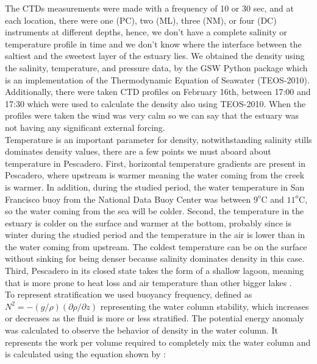 \documentclass[tesis.tex]{subfiles}
\begin{document}
The CTDs measurements were made with a frequency of 10 or 30 sec, and at each location, there were one (PC), two (ML), three (NM), or four (DC) instruments at different depths, hence, we don't have a complete salinity or temperature profile in time and we don't know where the interface between the saltiest and the sweetest layer of the estuary lies. We obtained the density using the salinity, temperature, and pressure data, by the GSW Python package which is an implementation of the Thermodynamic Equation of Seawater (TEOS-2010).\\

Additionally, there were taken CTD profiles on February 16th, between 17:00 and 17:30 which were used to calculate the density also using TEOS-2010. When the profiles were taken the wind was very calm so we can say that the estuary was not having any significant external forcing. \\

Temperature is an important parameter for density, notwithstanding salinity stills dominates density values, there are a few points we must aboard about temperature in Pescadero. First, horizontal temperature gradients are present in Pescadero, where upstream is warmer meaning the water coming from the creek is warmer. In addition, during the studied period, the water temperature in San Francisco buoy from the National Data Buoy Center was between $9^o$C and $11^o$C, so the water coming from the sea will be colder. Second, the temperature in the estuary is colder on the surface and warmer at the bottom, probably since is winter during the studied period and the temperature in the air is lower than in the water coming from upstream. The coldest temperature can be on the surface without sinking for being denser because salinity dominates density in this case. Third, Pescadero in its closed state takes the form of a shallow lagoon, meaning that is more prone to heat loss and air temperature than other bigger lakes \citep{peeters2009currents}.\\

To represent stratification we used buoyancy frequency, defined as $N^2 = -(g/\rho)(\partial \rho/\partial z)$ \citep{kundu2002fluid} representing the water column stability, which increases or decreases as the fluid is more or less stratified. The potential energy anomaly was calculated to observe the behavior of density in the water column. It represents the work per volume required to completely mix the water column and is calculated using the equation shown by \cite{simpson1990tidal}: 
\end{document}

